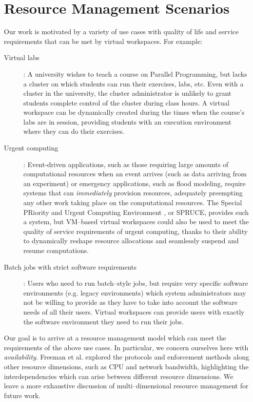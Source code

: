 \documentclass[singlespace]{ccw_chithesis}
\begin{document}
\chapter{Resource Management Scenarios}
\label{cha:scenarios}

Our work is motivated by a variety of use cases with quality of life and service requirements that can be met by virtual workspaces. For example:

\begin{description}
\item [Virtual labs]: A university wishes to teach a course on Parallel Programming, but lacks a cluster on which students can run their exercises, labs, etc. Even with a cluster in the university, the cluster administrator is unlikely to grant students complete control of the cluster during class hours. A virtual workspace can be dynamically created during the times when the course's labs are in session, providing students with an execution environment where they can do their exercises.
\item [Urgent computing]: Event-driven applications, such as those requiring large amounts of computational resources when an event arrives (such as data arriving from an experiment) or emergency applications, such as flood modeling, require systems that can \emph{immediately} provision resources, adequately preempting any other work taking place on the computational resources. The Special PRiority and Urgent Computing Environment \cite{spruceweb}, or SPRUCE, provides such a system, but VM--based virtual workspaces could also be used to meet the quality of service requirements of urgent computing, thanks to their ability to dynamically reshape resource allocations and seamlessly suspend and resume computations.
\item [Batch jobs with strict software requirements]: Users who need to run batch--style jobs, but require very specific software environments (e.g. legacy environments) which system administrators may not be willing to provide as they have to take into account the software needs of all their users. Virtual workspaces can provide users with exactly the software environment they need to run their jobs.
\end{description}

Our goal is to arrive at a resource management model which can meet the requirements of the above use cases. In particular, we concern ourselves here with \emph{availability}. Freeman et al. \cite{DBLP:conf/icsoc/FreemanKFRSW06} explored the protocols and enforcement methods along other resource dimensions, such as CPU and network bandwidth, highlighting the interdependencies which can arise between different resource dimensions. We leave a more exhaustive discussion of multi--dimensional resource management for future work.
\end{document}
